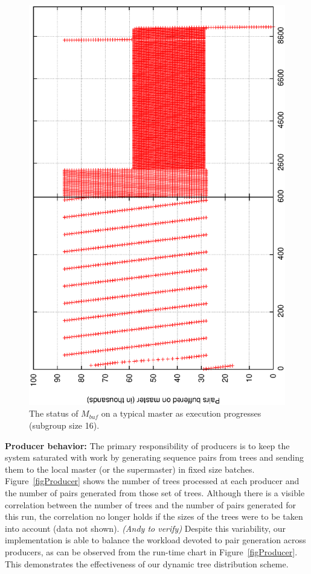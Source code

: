 \documentclass[10pt,journal,letterpaper,compsoc]{IEEEtran}
\begin{document}
\begin{figure}[thb]
\centerline{
						\includegraphics[angle=-90, scale=0.3]{Group.pBuf.eps}
            }
\caption{
The status of $M_{buf}$ on a typical master as execution progresses (subgroup size 16). 
}
\label{figMBuffer}
\end{figure}

{\bf Producer behavior:} The primary responsibility of producers is to keep the system saturated with work by generating sequence pairs from trees and sending them to the local master (or the supermaster) in fixed size batches. Figure~\ref{figProducer} shows the number of trees processed at each producer and the number of pairs generated from those set of trees. Although there is a visible correlation between the number of trees and the number of pairs generated for this run, the correlation no longer holds if the sizes of the trees were to be taken into account (data not shown). {\it (Andy to verify)} Despite this variability, our implementation is able to balance the workload devoted to pair generation across producers, as can be observed from the run-time chart in Figure~\ref{figProducer}. This demonstrates the effectiveness of our dynamic tree distribution scheme. 
\end{document}
